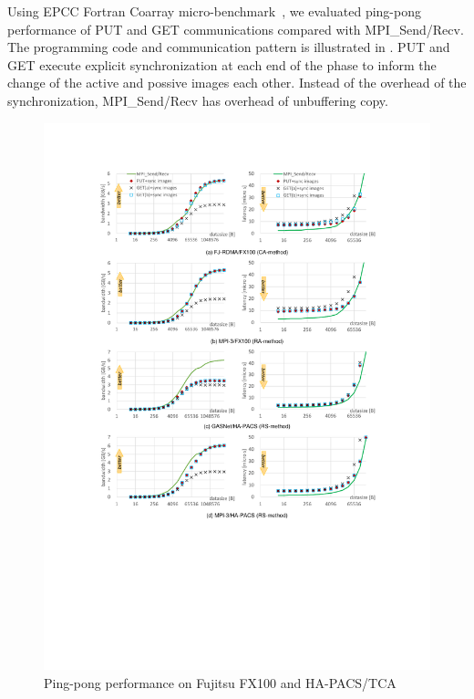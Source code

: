 Using EPCC Fortran Coarray micro-benchmark~\cite{EPCC}, we evaluated ping-pong performance 
of PUT and GET communications compared with MPI\_Send/Recv.
The programming code and communication pattern is illustrated in .
%
PUT and GET execute explicit synchronization at each end of the phase to inform the change
of the active and possive images each other.  Instead of the overhead of the synchronization, 
MPI\_Send/Recv has overhead of unbuffering copy.

\begin{figure}
  \begin{center}
    \mbox{\includegraphics[trim=30mm 80mm 30mm 25mm, scale=0.8, clip]{graphs/8graphs-7.pdf}}
    \caption{Ping-pong performance on Fujitsu FX100 and HA-PACS/TCA}\label{fig:8graphs}
  \end{center}
\end{figure}

